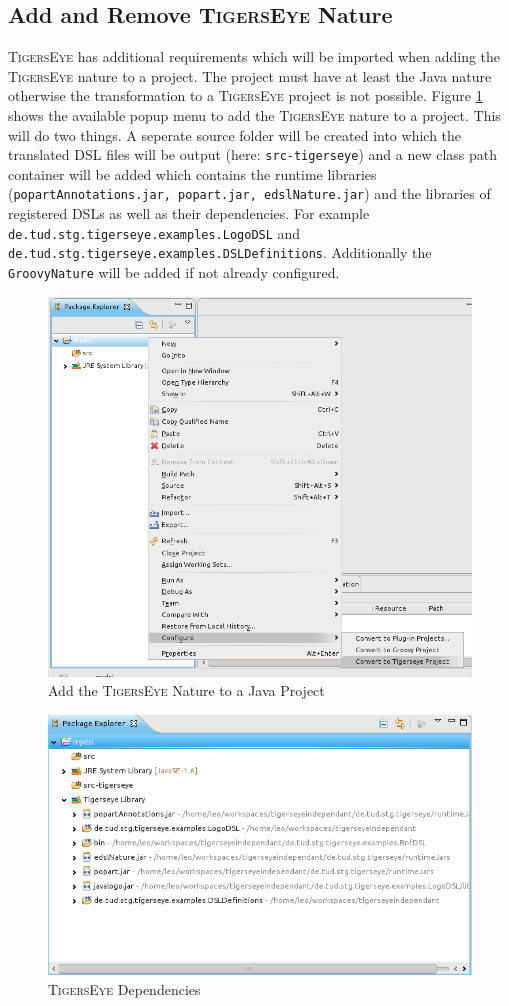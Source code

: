 \documentclass[article,colorback,accentcolor=tud4c]{tudreport}
\newcommand\tiger{%
  \textsc{TigersEye}
}
\begin{document}
	\subsection{Add and Remove \tiger Nature}
	  \tiger has additional requirements which will be imported when adding the \tiger nature to a project. The project must have at least the Java nature otherwise the transformation to a \tiger project is not possible. Figure \ref{fig:add_tiger_nature} shows the available popup menu to add the \tiger nature to a project. This will do two things. A seperate source folder will be created into which the translated DSL files will be output (here: \texttt{src-tigerseye}) and a new class path container will be added which contains the runtime libraries (\texttt{popartAnnotations.jar, popart.jar, edslNature.jar}) and the libraries of registered DSLs as well as their dependencies. For example \texttt{de.tud.stg.tigerseye.examples.LogoDSL} and \texttt{de.tud.stg.tigerseye.examples.DSLDefinitions}. Additionally the \texttt{GroovyNature} will be added if not already configured.
	
	\begin{figure}
	  \centering
	  \includegraphics[width=.5\textwidth,keepaspectratio=true]{./pics/convert_to_tigerseye.png}
	  \caption{Add the \tiger Nature to a Java Project}
	  \label{fig:add_tiger_nature}
	\end{figure}
	
	\begin{figure}
	  \centering
	  \includegraphics[width=.5\textwidth,keepaspectratio=true]{./pics/tigerseye_dependencies.png}
	  \caption{\tiger Dependencies}
	  \label{fig:tiger_added_dependencies}
	\end{figure}
	
\end{document}
